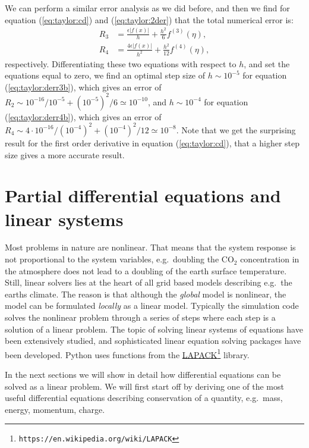 \documentclass[graybox,sectrefs,envcountresetchap,open=right,final]{svmonodo}
\begin{document}
We can perform a similar error analysis as we did before, and then we find for equation (\ref{eq:taylor:cd}) and (\ref{eq:taylor:2der}) that the total
numerical error is:
\begin{align}
R_3&=\frac{\epsilon|f(x)|}{h}+\frac{h^2}{6}f^{(3)}(\eta),\label{eq:taylor:derr3b}\\ 
R_4&=\frac{4\epsilon|f(x)|}{h^2}+\frac{h^2}{12}f^{(4)}(\eta),\label{eq:taylor:derr4b}
\end{align}
respectively. Differentiating these two equations with respect to $h$, and set the equations equal to zero, we find an optimal step size of
$h\sim10^{-5}$ for equation (\ref{eq:taylor:derr3b}), which gives an error of $R_2\sim 10^{-16}/10^{-5}+(10^{-5})^2/6\simeq10^{-10}$, and $h\sim10^{-4}$ for equation
(\ref{eq:taylor:derr4b}), which gives an error of $R_4\sim 4\cdot10^{-16}/(10^{-4})^2+(10^{-4})^2/12\simeq10^{-8}$. Note that we get the surprising result for the first order 
derivative in equation (\ref{eq:taylor:cd}), that a higher step size gives a more accurate result. 


\chapter{Partial differential equations and linear systems}
\label{ch:lin}
Most problems in nature are nonlinear. That means that the system response is not proportional to the system variables, e.g.~doubling the CO$_2$ concentration in the atmosphere does not lead to a doubling of the earth surface temperature. Still, linear solvers lies at the heart of all grid based models describing e.g.~the earths climate. The reason is that although the \emph{global} model is nonlinear, the model can be formulated \emph{locally} as a linear model. Typically the simulation code solves the nonlinear problem through a series of steps where each step is a solution of a linear problem. The topic of solving linear systems of equations have been extensively studied, and sophisticated linear equation solving packages have been developed. Python uses functions from the \href{{https://en.wikipedia.org/wiki/LAPACK}}{LAPACK}\footnote{\texttt{https://en.wikipedia.org/wiki/LAPACK}} library.

In the next sections we will show in detail how differential equations can be solved as a linear problem. We will first start off by deriving one of the most useful differential equations describing conservation of a quantity, e.g.~mass, energy, momentum, charge.
\end{document}
